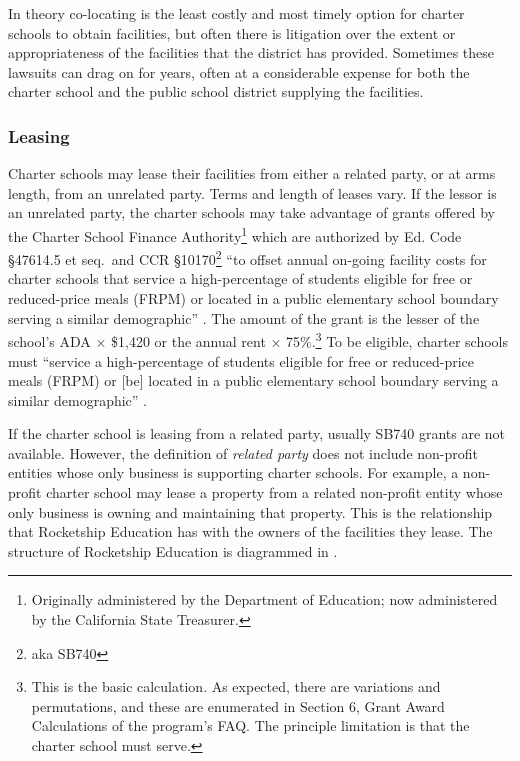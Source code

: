 In theory co-locating is the least costly and most timely option for charter schools to obtain facilities, but often there is litigation over the extent or appropriateness of the facilities that the district has provided. Sometimes these lawsuits can drag on for years, often at a considerable expense for both the charter school and the public school district supplying the facilities.

\subsubsection{Leasing}\label{sec:leasing}\indent

Charter schools may lease their facilities from either a related party, or at arms length, from an unrelated party. Terms and length of leases vary. If the lessor is an unrelated party, the charter schools may take advantage of grants offered by the Charter School Finance Authority\footnote{Originally administered by the Department of Education; now administered by the California State Treasurer.} which are authorized by Ed. Code §47614.5 et seq. and CCR §10170\footnote{aka SB740} ``to offset annual on-going facility costs for charter schools that service a high-percentage of students eligible for free or reduced-price meals (FRPM) or located in a public elementary school boundary serving a similar demographic'' \parencite{CATreasurer2023}. The amount of the grant is the lesser of the school's ADA × \$1,420 or the annual rent × 75\%.\footnote{This is the basic calculation. As expected, there are variations and permutations, and these are enumerated in Section 6, Grant Award Calculations of the program's FAQ\@. The principle limitation is that the charter school must serve.} To be eligible, charter schools must ``service a high-percentage of students eligible for free or reduced-price meals (FRPM) or [be] located in a public elementary school boundary serving a similar demographic'' \parencite{CATreasurer2023}.

If the charter school is leasing from a related party, usually SB740 grants are not available. However, the definition of \emph{related party} does not include non-profit entities whose only business is supporting charter schools. For example, a non-profit charter school may lease a property from a related non-profit entity whose only business is owning and maintaining that property. This is the relationship that Rocketship Education has with the owners of the facilities they lease. The structure of Rocketship Education is diagrammed in .

